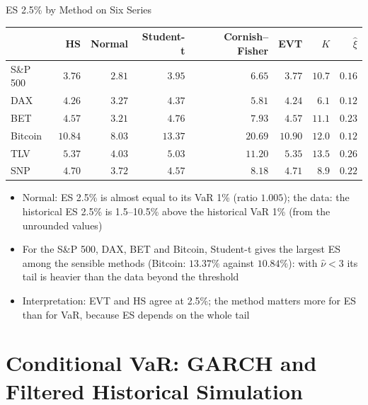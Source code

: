 \begin{frame}{ES 2.5\% by Method on Six Series}
\itemsize{\footnotesize}
\begin{center}
\footnotesize
\begin{tabular}{lrrrrrrr}
\toprule
& HS & Normal & Student-t & Cornish--Fisher & EVT & $K$ & $\hat\xi$ \\
\midrule
S\&P 500 & $3.76$ & $2.81$ & $3.95$ & $6.65$ & $3.77$ & ${10.7}$ & $0.16$ \\
DAX & $4.26$ & $3.27$ & $4.37$ & $5.81$ & $4.24$ & ${6.1}$ & $0.12$ \\
BET & $4.57$ & $3.21$ & $4.76$ & $7.93$ & $4.57$ & ${11.1}$ & $0.23$ \\
Bitcoin & $10.84$ & $8.03$ & $13.37$ & $20.69$ & $10.90$ & ${12.0}$ & $0.12$ \\
TLV & $5.37$ & $4.03$ & $5.03$ & $11.20$ & $5.35$ & ${13.5}$ & $0.26$ \\
SNP & $4.70$ & $3.72$ & $4.57$ & $8.18$ & $4.71$ & ${8.9}$ & $0.22$ \\
\bottomrule
\end{tabular}
\end{center}
\begin{itemize}
    \item Normal: ES 2.5\% is almost equal to its VaR 1\% (ratio $1.005$); the data: the historical ES 2.5\% is 1.5--10.5\% above the historical VaR 1\% (from the unrounded values)
    \item For the S\&P 500, DAX, BET and Bitcoin, Student-t gives the largest ES among the sensible methods (Bitcoin: $13.37\%$ against $10.84\%$): with $\hat\nu < 3$ its tail is heavier than the data beyond the threshold
    \item Interpretation: EVT and HS agree at 2.5\%; the method matters more for ES than for VaR, because ES depends on the whole tail
\end{itemize}
\end{frame}


\section{Conditional VaR: GARCH and Filtered Historical Simulation}

